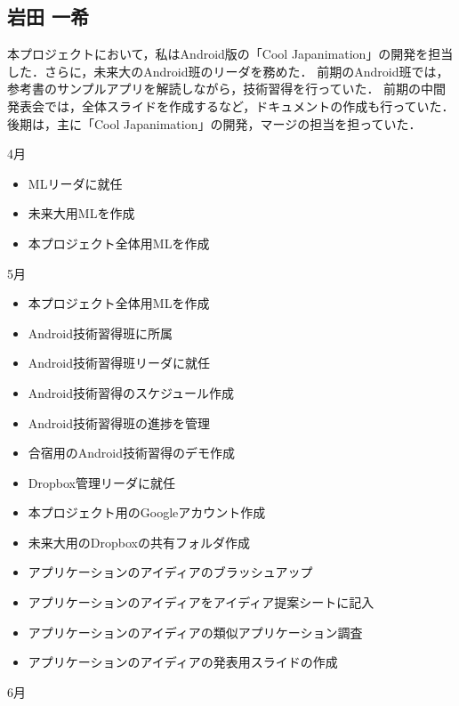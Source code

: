 \subsection{岩田 一希}
\par
本プロジェクトにおいて，私はAndroid版の「Cool Japanimation」の開発を担当した．さらに，未来大のAndroid班のリーダを務めた．
前期のAndroid班では，参考書のサンプルアプリを解読しながら，技術習得を行っていた．
前期の中間発表会では，全体スライドを作成するなど，ドキュメントの作成も行っていた．
後期は，主に「Cool Japanimation」の開発，マージの担当を担っていた．

4月
\begin{itemize}
\item MLリーダに就任
\item 未来大用MLを作成
\item 本プロジェクト全体用MLを作成
\end{itemize}
5月
\begin{itemize}
\item 本プロジェクト全体用MLを作成
\item Android技術習得班に所属
\item Android技術習得班リーダに就任
\item Android技術習得のスケジュール作成
\item Android技術習得班の進捗を管理
\item 合宿用のAndroid技術習得のデモ作成
\item Dropbox管理リーダに就任
\item 本プロジェクト用のGoogleアカウント作成
\item 未来大用のDropboxの共有フォルダ作成
\item アプリケーションのアイディアのブラッシュアップ
\item アプリケーションのアイディアをアイディア提案シートに記入
\item アプリケーションのアイディアの類似アプリケーション調査
\item アプリケーションのアイディアの発表用スライドの作成
\end{itemize}
6月
